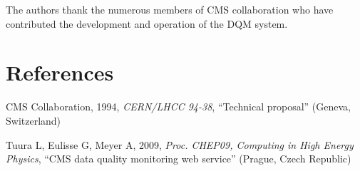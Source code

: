 \documentclass[a4paper]{jpconf}
\begin{document}
\ack

The authors thank the numerous members of CMS collaboration who
have contributed the development and operation of the DQM system.


\section*{References}
\begin{thebibliography}{9}

  CMS Collaboration,
  1994, {\it CERN/LHCC 94-38},
  ``Technical proposal''
  (Geneva, Switzerland)

  Tuura L, Eulisse G, Meyer A,
  2009, {\it Proc. CHEP09, Computing in High Energy Physics},
  ``CMS data quality monitoring web service''
  (Prague, Czech Republic)

\end{thebibliography}
\end{document}
